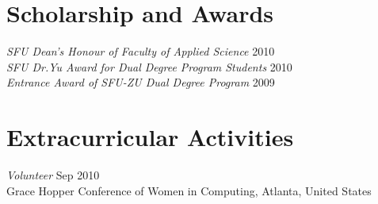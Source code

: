 \documentclass[line,margin]{res}
\begin{document}
\begin{resume}
\section {Scholarship and Awards}
    {\sl SFU Dean's Honour of Faculty of Applied Science} \hfill 2010 \\
	{\sl SFU Dr.Yu Award for Dual Degree Program Students} \hfill 2010 \\
	{\sl Entrance Award of SFU-ZU Dual Degree Program} \hfill 2009


\section {Extracurricular Activities}
    {\sl Volunteer} \hfill Sep 2010\\
	Grace Hopper Conference of Women in Computing, Atlanta, United States

	
\end{resume}
\end{document}
